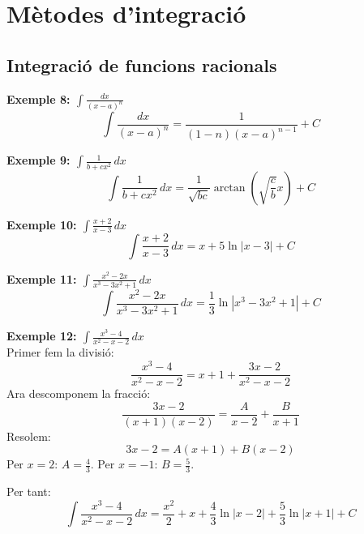 \documentclass[12pt]{article}
\begin{document}
\section{Mètodes d'integració}

\subsection{Integració de funcions racionals}

\begin{exemple}
\textbf{Exemple 8: $\displaystyle \int \frac{dx}{(x-a)^n}$}\\
\[
\int \frac{dx}{(x-a)^n} = \frac{1}{(1-n)(x-a)^{n-1}} + C
\]
\end{exemple}

\begin{exemple}
\textbf{Exemple 9: $\displaystyle \int \frac{1}{b+cx^2}\,dx$}\\
\[
\int \frac{1}{b+cx^2}\,dx = \frac{1}{\sqrt{bc}} \arctan\left(\sqrt{\frac{c}{b}}x\right) + C
\]
\end{exemple}

\begin{exemple}
\textbf{Exemple 10: $\displaystyle \int \frac{x+2}{x-3}\,dx$}\\
\[
\int \frac{x+2}{x-3}\,dx = x + 5\ln|x-3| + C
\]
\end{exemple}

\begin{exemple}
\textbf{Exemple 11: $\displaystyle \int \frac{x^2-2x}{x^3-3x^2+1}\,dx$}\\
\[
\int \frac{x^2-2x}{x^3-3x^2+1}\,dx = \frac{1}{3} \ln|x^3-3x^2+1| + C
\]
\end{exemple}

\begin{exemple}
\textbf{Exemple 12: $\displaystyle \int \frac{x^3-4}{x^2-x-2}\,dx$}\\
Primer fem la divisió:
\[
\frac{x^3-4}{x^2-x-2} = x+1 + \frac{3x-2}{x^2-x-2}
\]
Ara descomponem la fracció:
\[
\frac{3x-2}{(x+1)(x-2)} = \frac{A}{x-2} + \frac{B}{x+1}
\]
Resolem:
\[
3x-2 = A(x+1) + B(x-2)
\]
Per $x=2$: $A=\frac{4}{3}$. Per $x=-1$: $B=\frac{5}{3}$.

Per tant:
\[
\int \frac{x^3-4}{x^2-x-2}\,dx = \frac{x^2}{2} + x + \frac{4}{3}\ln|x-2| + \frac{5}{3}\ln|x+1| + C
\]
\end{exemple}
\end{document}
